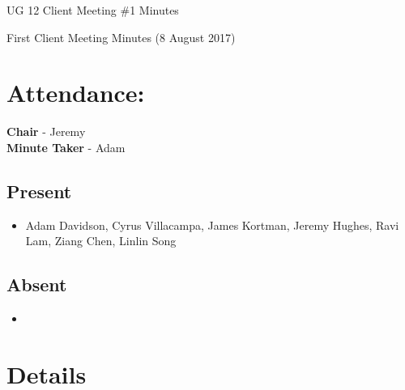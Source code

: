 \documentclass{article}
\begin{document}
\begin{adjustwidth}{2.5em}{0pt}
\begin{center}
\Large{UG 12 Client Meeting \#1 Minutes}\\
\end{center}
\end{adjustwidth}


First Client Meeting Minutes (8 August 2017)
\section{Attendance:}
\textbf{Chair} - Jeremy\\
\textbf{Minute Taker} - Adam\\
\subsection*{Present}
\begin{itemize}
\item Adam Davidson, Cyrus Villacampa, James Kortman, Jeremy Hughes, Ravi Lam, Ziang Chen, Linlin Song
\end{itemize}
\subsection*{Absent}
\begin{itemize}
\item  
\end {itemize}

\section{Details}
\end{document}
